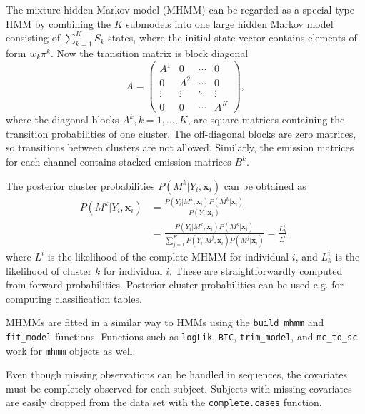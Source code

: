 \documentclass[12pt]{article}\usepackage[]{graphicx}\usepackage[]{color}
\begin{document}
The mixture hidden Markov model (MHMM) can be regarded as a special type HMM by combining the $K$ submodels into one large hidden Markov model consisting of $\sum_{k=1}^K S_k$ states, where the initial state vector contains elements of form $w_k\pi^k$. Now the transition matrix is block diagonal
\begin{equation}
A =
 \begin{pmatrix}
  A^1   	& 0 			& \cdots & 0 			\\
  0 			& A^2 		& \cdots & 0 			\\
  \vdots  & \vdots  & \ddots & \vdots \\
  0 			& 0 			& \cdots & A^K
 \end{pmatrix},
\end{equation}
where the diagonal blocks $A^k, k=1,\ldots,K$, are square matrices containing the transition probabilities of one cluster. The off-diagonal blocks are zero matrices, so transitions between clusters are not allowed. Similarly, the emission matrices for each channel contains stacked emission matrices $B^k$.

The posterior cluster probabilities $P(M^k|Y_i, \textbf{x}_i)$ can be obtained as
\begin{equation}
  \begin{aligned}
P(M^k|Y_i, \textbf{x}_i) &= \frac{P(Y_i | M^k, \textbf{x}_i) P(M^k|\textbf{x}_i) }{P(Y_i| \textbf{x}_i)}\\
&= \frac{P(Y_i | M^k, \textbf{x}_i) P(M^k|\textbf{x}_i) }{\sum_{j=1}^K P(Y_i |M^j, \textbf{x}_i) P(M^j|\textbf{x}_i)} = \frac{L_k^i}{L^i},
  \end{aligned}
\end{equation}
where $L^i$ is the likelihood of the complete MHMM for individual $i$, and $L_k^i$ is the likelihood of cluster $k$ for individual $i$. These are straightforwardly computed from forward probabilities. Posterior cluster probabilities can be used e.g. for computing classification tables.

MHMMs are fitted in a similar way to HMMs using the \texttt{build\_mhmm} and \texttt{fit\_model} functions. Functions such as \texttt{logLik}, \texttt{BIC}, \texttt{trim\_model}, and \texttt{mc\_to\_sc} work for \texttt{mhmm} objects as well.

Even though missing observations can be handled in sequences, the covariates must be completely observed for each subject. Subjects with missing covariates are easily dropped from the data set with the \texttt{complete.cases} function.
\end{document}
